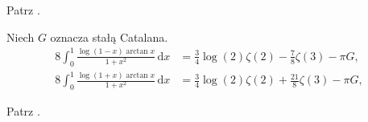 
\begin{solution}
    Patrz \cite[s. 10, 11]{valean19}.
\end{solution}


\begin{problem_with_solution}
    \label{valean_1_20}%
    Niech $G$ oznacza stałą Catalana.
    \begin{align}
        8 \int_0^1 \frac{\log (1 - x) \arctan x}{1+x^2} \,\mathrm{d}x & = \frac 3 4 \log (2) \zeta(2) - \frac 7 8 \zeta(3) - \pi G, \\
        8 \int_0^1 \frac{\log (1 + x) \arctan x}{1+x^2} \,\mathrm{d}x & = \frac 3 4 \log (2) \zeta(2) + \frac {21} 8 \zeta(3) - \pi G,
    \end{align} 
\end{problem_with_solution}


\begin{solution}
    Patrz \cite[s. 12]{valean19}.
\end{solution}

%